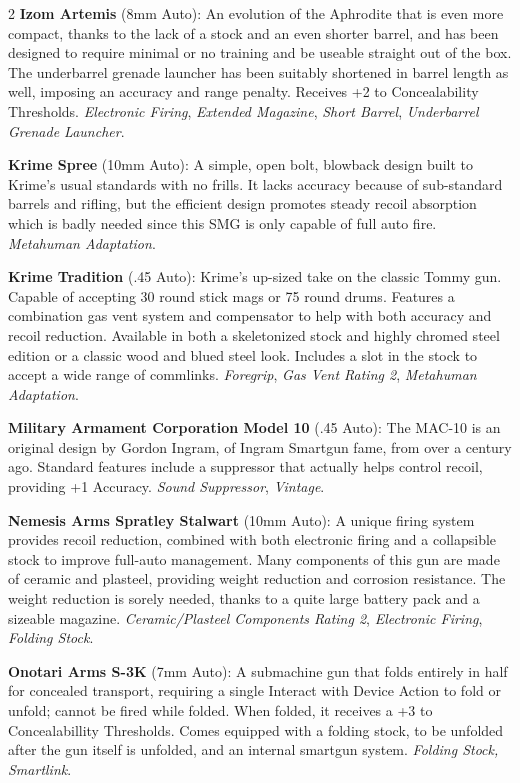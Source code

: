 \documentclass[
  oneside]{article}
\begin{document}
\begin{multicols}{2}
\textbf{Izom Artemis} (8mm Auto): An evolution of
the Aphrodite that is even more compact, thanks to
the lack of a stock and an even shorter barrel,
and has been designed to require minimal or no
training and be useable straight out of the box.
The underbarrel grenade launcher has been suitably
shortened in barrel length as well, imposing an
accuracy and range penalty. Receives +2 to
Concealability Thresholds. \emph{Electronic
Firing}, \emph{Extended Magazine}, \emph{Short
Barrel}, \emph{Underbarrel Grenade Launcher}.

\textbf{Krime Spree} (10mm Auto): A simple, open
bolt, blowback design built to Krime's usual
standards with no frills. It lacks accuracy
because of sub-standard barrels and rifling, but
the efficient design promotes steady recoil
absorption which is badly needed since this SMG is
only capable of full auto fire. \emph{Metahuman
Adaptation}.

\textbf{Krime Tradition} (.45 Auto): Krime's
up-sized take on the classic Tommy gun. Capable of
accepting 30 round stick mags or 75 round drums.
Features a combination gas vent system and
compensator to help with both accuracy and recoil
reduction. Available in both a skeletonized stock
and highly chromed steel edition or a classic wood
and blued steel look. Includes a slot in the stock
to accept a wide range of commlinks.
\emph{Foregrip}, \emph{Gas Vent Rating 2},
\emph{Metahuman Adaptation}.

\textbf{Military Armament Corporation Model 10}
(.45 Auto): The MAC-10 is an original design by
Gordon Ingram, of Ingram Smartgun fame, from over
a century ago. Standard features include a
suppressor that actually helps control recoil,
providing +1 Accuracy. \emph{Sound Suppressor},
\emph{Vintage}.

\textbf{Nemesis Arms Spratley Stalwart} (10mm
Auto): A unique firing system provides recoil
reduction, combined with both electronic firing
and a collapsible stock to improve full-auto
management. Many components of this gun are made
of ceramic and plasteel, providing weight
reduction and corrosion resistance. The weight
reduction is sorely needed, thanks to a quite
large battery pack and a sizeable magazine.
\emph{Ceramic/Plasteel Components Rating 2},
\emph{Electronic Firing}, \emph{Folding Stock}.

\textbf{Onotari Arms S-3K} (7mm Auto): A
submachine gun that folds entirely in half for
concealed transport, requiring a single Interact
with Device Action to fold or unfold; cannot be
fired while folded. When folded, it receives a +3
to Concealabillity Thresholds. Comes equipped with
a folding stock, to be unfolded after the gun
itself is unfolded, and an internal smartgun
system. \emph{Folding Stock, Smartlink}.


\end{multicols}
\end{document}
